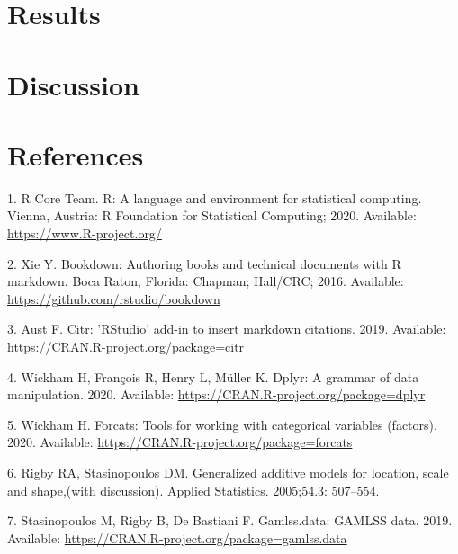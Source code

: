 \documentclass[10pt,letterpaper]{article}
\begin{document}
\hypertarget{results}{%
\section{Results}\label{results}}

\hypertarget{discussion}{%
\section{Discussion}\label{discussion}}

\newpage

\hypertarget{references}{%
\section{References}\label{references}}

\begingroup
\setlength{\parindent}{-0.5in}
\setlength{\leftskip}{0.5in}

\hypertarget{refs}{}
\leavevmode\hypertarget{ref-R-base}{}%
1. R Core Team. R: A language and environment for statistical computing.
Vienna, Austria: R Foundation for Statistical Computing; 2020.
Available: \url{https://www.R-project.org/}

\leavevmode\hypertarget{ref-R-bookdown}{}%
2. Xie Y. Bookdown: Authoring books and technical documents with R
markdown. Boca Raton, Florida: Chapman; Hall/CRC; 2016. Available:
\url{https://github.com/rstudio/bookdown}

\leavevmode\hypertarget{ref-R-citr}{}%
3. Aust F. Citr: 'RStudio' add-in to insert markdown citations. 2019.
Available: \url{https://CRAN.R-project.org/package=citr}

\leavevmode\hypertarget{ref-R-dplyr}{}%
4. Wickham H, François R, Henry L, Müller K. Dplyr: A grammar of data
manipulation. 2020. Available:
\url{https://CRAN.R-project.org/package=dplyr}

\leavevmode\hypertarget{ref-R-forcats}{}%
5. Wickham H. Forcats: Tools for working with categorical variables
(factors). 2020. Available:
\url{https://CRAN.R-project.org/package=forcats}

\leavevmode\hypertarget{ref-R-gamlss}{}%
6. Rigby RA, Stasinopoulos DM. Generalized additive models for location,
scale and shape,(with discussion). Applied Statistics. 2005;54.3:
507--554.

\leavevmode\hypertarget{ref-R-gamlss.data}{}%
7. Stasinopoulos M, Rigby B, De Bastiani F. Gamlss.data: GAMLSS data.
2019. Available: \url{https://CRAN.R-project.org/package=gamlss.data}
\end{document}
